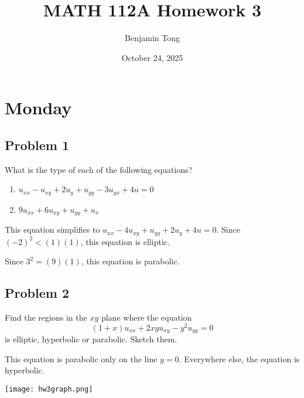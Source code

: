 \documentclass{ben}
\title{MATH 112A Homework 3}
\author{Benjamin Tong}
\date{October 24, 2025}
\begin{document}
\maketitle
\section{Monday}
\subsection{Problem 1}
What is the type of each of the following equations?
\begin{enumerate}
    \item $u_{xx} - u_{xy} + 2 u_y + u_{yy} - 3 u_{yx} + 4u = 0$
    \item $9u_{xx} + 6u_{xy} + u_{yy} + u_{x}$
\end{enumerate}
\begin{multipart}
    \item This equation simplifies to $u_{xx} - 4u_{xy} + u_{yy} + 2 u_y + 4u = 0$.
    Since $(-2)^2 < (1)(1)$, this equation is elliptic.
    \item Since $3^2 = (9)(1)$, this equation is parabolic.
\end{multipart}
\subsection{Problem 2}
Find the regions in the $xy$ plane where the equation
\[
  (1 + x) u_{xx} + 2xy u_{xy} - y^{2} u_{yy} = 0
\]
is elliptic, hyperbolic or parabolic. Sketch them.
\begin{solution}
  This equation is parabolic only on the line $y = 0$. Everywhere else, the
  equation is hyperbolic.
  \begin{center}
    \texttt{[image: hw3graph.png]}
  \end{center}
\end{solution}
\newpage
\end{document}
